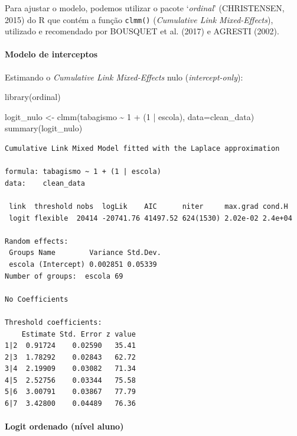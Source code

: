 \documentclass[
]{article}
\let\oldparagraph\paragraph
\renewcommand{\paragraph}[1]{\oldparagraph{#1}\mbox{}}
\newenvironment{Shaded}{\begin{snugshade}}{\end{snugshade}}
\newcommand{\AttributeTok}[1]{\textcolor[rgb]{0.40,0.45,0.13}{#1}}
\newcommand{\DecValTok}[1]{\textcolor[rgb]{0.68,0.00,0.00}{#1}}
\newcommand{\FunctionTok}[1]{\textcolor[rgb]{0.28,0.35,0.67}{#1}}
\newcommand{\NormalTok}[1]{\textcolor[rgb]{0.00,0.23,0.31}{#1}}
\newcommand{\OtherTok}[1]{\textcolor[rgb]{0.00,0.23,0.31}{#1}}
\newcommand{\SpecialCharTok}[1]{\textcolor[rgb]{0.37,0.37,0.37}{#1}}
\begin{document}
Para ajustar o modelo, podemos utilizar o pacote `\emph{ordinal}'
(CHRISTENSEN, 2015) do R que contém a função \texttt{clmm()}
(\emph{Cumulative Link Mixed-Effects}), utilizado e recomendado por
BOUSQUET et al. (2017) e AGRESTI (2002).

\hypertarget{modelo-de-interceptos}{%
\paragraph{Modelo de interceptos}\label{modelo-de-interceptos}}

Estimando o \emph{Cumulative Link Mixed-Effects} nulo
(\emph{intercept-only}):

\begin{Shaded}
\begin{Highlighting}[]
\FunctionTok{library}\NormalTok{(ordinal)}

\NormalTok{logit\_nulo }\OtherTok{\textless{}{-}} \FunctionTok{clmm}\NormalTok{(tabagismo }\SpecialCharTok{\textasciitilde{}} \DecValTok{1} \SpecialCharTok{+}\NormalTok{ (}\DecValTok{1} \SpecialCharTok{|}\NormalTok{ escola), }\AttributeTok{data=}\NormalTok{clean\_data)}
\FunctionTok{summary}\NormalTok{(logit\_nulo)}
\end{Highlighting}
\end{Shaded}

\begin{verbatim}
Cumulative Link Mixed Model fitted with the Laplace approximation

formula: tabagismo ~ 1 + (1 | escola)
data:    clean_data

 link  threshold nobs  logLik    AIC      niter     max.grad cond.H 
 logit flexible  20414 -20741.76 41497.52 624(1530) 2.02e-02 2.4e+04

Random effects:
 Groups Name        Variance Std.Dev.
 escola (Intercept) 0.002851 0.05339 
Number of groups:  escola 69 

No Coefficients

Threshold coefficients:
    Estimate Std. Error z value
1|2  0.91724    0.02590   35.41
2|3  1.78292    0.02843   62.72
3|4  2.19909    0.03082   71.34
4|5  2.52756    0.03344   75.58
5|6  3.00791    0.03867   77.79
6|7  3.42800    0.04489   76.36
\end{verbatim}

\hypertarget{logit-ordenado-nuxedvel-aluno}{%
\paragraph{Logit ordenado (nível
aluno)}\label{logit-ordenado-nuxedvel-aluno}}
\end{document}
